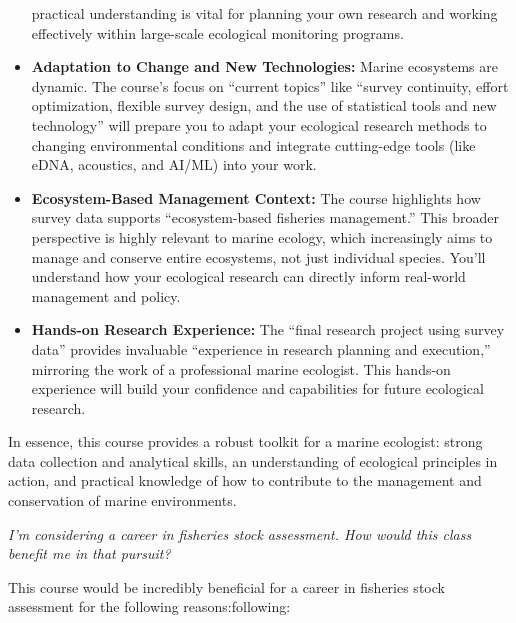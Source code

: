 \documentclass[
  letterpaper,
  oneside,
  open=any]{scrbook}
\begin{document}
\begin{itemize}
  practical understanding is vital for planning your own research and
  working effectively within large-scale ecological monitoring programs.
\item
  \textbf{Adaptation to Change and New Technologies:} Marine ecosystems
  are dynamic. The course's focus on ``current topics'' like ``survey
  continuity, effort optimization, flexible survey design, and the use
  of statistical tools and new technology'' will prepare you to adapt
  your ecological research methods to changing environmental conditions
  and integrate cutting-edge tools (like eDNA, acoustics, and AI/ML)
  into your work.
\item
  \textbf{Ecosystem-Based Management Context:} The course highlights how
  survey data supports ``ecosystem-based fisheries management.'' This
  broader perspective is highly relevant to marine ecology, which
  increasingly aims to manage and conserve entire ecosystems, not just
  individual species. You'll understand how your ecological research can
  directly inform real-world management and policy.
\item
  \textbf{Hands-on Research Experience:} The ``final research project
  using survey data'' provides invaluable ``experience in research
  planning and execution,'' mirroring the work of a professional marine
  ecologist. This hands-on experience will build your confidence and
  capabilities for future ecological research.
\end{itemize}

In essence, this course provides a robust toolkit for a marine
ecologist: strong data collection and analytical skills, an
understanding of ecological principles in action, and practical
knowledge of how to contribute to the management and conservation of
marine environments.

\emph{I'm considering a career in fisheries stock assessment. How would
this class benefit me in that pursuit?}

This course would be incredibly beneficial for a career in fisheries
stock assessment for the following reasons:following:
\end{document}
